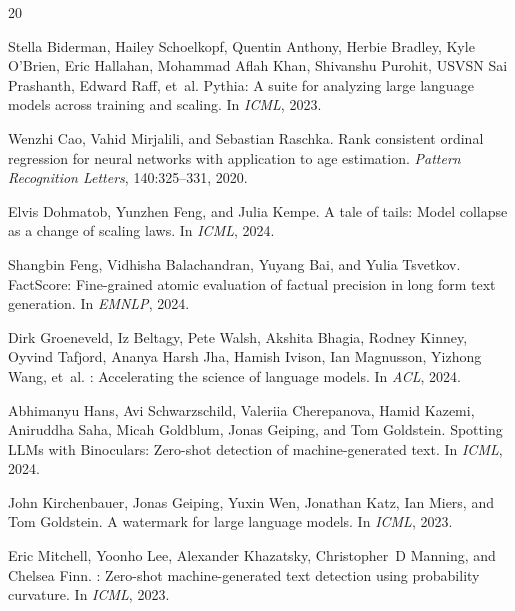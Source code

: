 \documentclass[11pt,a4paper]{article}
\begin{document}
\begin{thebibliography}{20}

Stella Biderman, Hailey Schoelkopf, Quentin Anthony, Herbie Bradley, Kyle O'Brien, Eric Hallahan, Mohammad Aflah Khan, Shivanshu Purohit, USVSN Sai Prashanth, Edward Raff, et~al.
\newblock Pythia: A suite for analyzing large language models across training and scaling.
\newblock In \emph{ICML}, 2023.

Wenzhi Cao, Vahid Mirjalili, and Sebastian Raschka.
\newblock Rank consistent ordinal regression for neural networks with application to age estimation.
\newblock \emph{Pattern Recognition Letters}, 140:325--331, 2020.

Elvis Dohmatob, Yunzhen Feng, and Julia Kempe.
\newblock A tale of tails: Model collapse as a change of scaling laws.
\newblock In \emph{ICML}, 2024.

Shangbin Feng, Vidhisha Balachandran, Yuyang Bai, and Yulia Tsvetkov.
\newblock FactScore: Fine-grained atomic evaluation of factual precision in long form text generation.
\newblock In \emph{EMNLP}, 2024.

Dirk Groeneveld, Iz Beltagy, Pete Walsh, Akshita Bhagia, Rodney Kinney, Oyvind Tafjord, Ananya Harsh Jha, Hamish Ivison, Ian Magnusson, Yizhong Wang, et~al.
: Accelerating the science of language models.
\newblock In \emph{ACL}, 2024.

Abhimanyu Hans, Avi Schwarzschild, Valeriia Cherepanova, Hamid Kazemi, Aniruddha Saha, Micah Goldblum, Jonas Geiping, and Tom Goldstein.
\newblock Spotting {LLMs} with Binoculars: Zero-shot detection of machine-generated text.
\newblock In \emph{ICML}, 2024.

John Kirchenbauer, Jonas Geiping, Yuxin Wen, Jonathan Katz, Ian Miers, and Tom Goldstein.
\newblock A watermark for large language models.
\newblock In \emph{ICML}, 2023.

Eric Mitchell, Yoonho Lee, Alexander Khazatsky, Christopher~D Manning, and Chelsea Finn.
: Zero-shot machine-generated text detection using probability curvature.
\newblock In \emph{ICML}, 2023.


\end{thebibliography}
\end{document}
